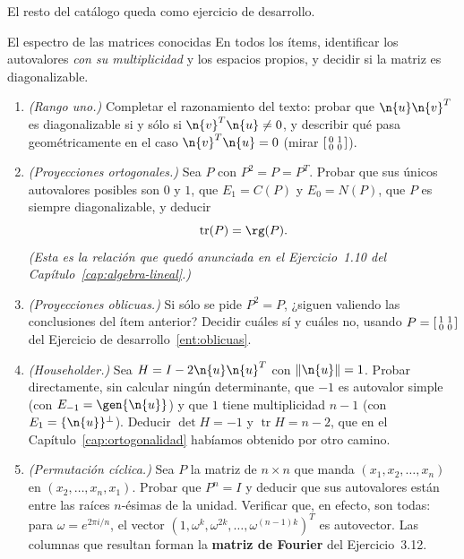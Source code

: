 El resto del catálogo queda como ejercicio de desarrollo.

\begin{entrega}{El espectro de las matrices conocidas}\label{ent:catalogo}
En todos los ítems, identificar los autovalores \emph{con su multiplicidad} y los
espacios propios, y decidir si la matriz es diagonalizable.

\begin{enumerate}[label=\textbf{(\alph*)},itemsep=3pt,topsep=4pt]
\item \emph{(Rango uno.)} Completar el razonamiento del texto: probar que
$\n{u}\n{v}^T$ es diagonalizable si y sólo si $\n{v}^T\n{u}\neq0$, y describir qué pasa
geométricamente en el caso $\n{v}^T\n{u}=0$ (mirar
$\begin{bsmallmatrix}0&1\\0&0\end{bsmallmatrix}$).

\item \emph{(Proyecciones ortogonales.)} Sea $P$ con $P^2=P=P^T$. Probar que sus únicos
autovalores posibles son $0$ y $1$, que $E_1=C(P)$ y $E_0=N(P)$, que $P$ es siempre
diagonalizable, y deducir
\[
\operatorname{tr}(P)=\rg(P).
\]
\emph{(Esta es la relación que quedó anunciada en el Ejercicio~1.10 del
Capítulo~\ref{cap:algebra-lineal}.)}

\item \emph{(Proyecciones oblicuas.)} Si sólo se pide $P^2=P$, ¿siguen valiendo las
conclusiones del ítem anterior? Decidir cuáles sí y cuáles no, usando
$P=\begin{bsmallmatrix}1&1\\0&0\end{bsmallmatrix}$ del Ejercicio de
desarrollo~\ref{ent:oblicuas}.

\item \emph{(Householder.)} Sea $H=I-2\n{u}\n{u}^T$ con $\|\n{u}\|=1$. Probar
directamente, sin calcular ningún determinante, que $-1$ es autovalor simple (con
$E_{-1}=\gen\{\n{u}\}$) y que $1$ tiene multiplicidad $n-1$ (con
$E_1=\{\n{u}\}^{\perp}$). Deducir $\det H=-1$ y $\operatorname{tr}H=n-2$, que en el
Capítulo~\ref{cap:ortogonalidad} habíamos obtenido por otro camino.

\item \emph{(Permutación cíclica.)} Sea $P$ la matriz de $n\times n$ que manda
$(x_1,x_2,\dots,x_n)$ en $(x_2,\dots,x_n,x_1)$. Probar que $P^n=I$ y deducir que sus
autovalores están entre las raíces $n$-ésimas de la unidad. Verificar que, en efecto,
son todas: para $\omega=e^{2\pi i/n}$, el vector
$(1,\omega^{k},\omega^{2k},\dots,\omega^{(n-1)k})^T$ es autovector. Las columnas que
resultan forman la \textbf{matriz de Fourier} del Ejercicio~3.12.


\end{enumerate}
\end{entrega}
